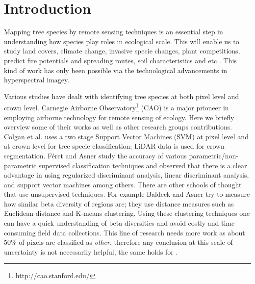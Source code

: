 \documentclass[remotesensing,article,accept,moreauthors,pdftex,12pt,a4paper]{mdpi}
\begin{document}
\section{Introduction}

Mapping tree species by remote sensing techniques is an essential step in understanding how species play roles in ecological scale. This will enable us to study land covers, climate change, invasive specie changes, plant competitions, predict fire potentials and spreading routes, soil characteristics and etc \cite{scholes1997tree, colgan2012mapping}. This kind of work has only been possible via the technological advancements in hyperspectral imagey. 

Various studies have dealt with identifying tree species at both pixel level and crown level. Carnegie Airborne Observatory\footnote{http://cao.stanford.edu/} (CAO)  is a major prioneer in employing airborne technology for remote sensing of ecology. Here we briefly overview some of their works as well as other research groups contributions. Colgan et al. \cite{colgan2012mapping} uses a two stage Support Vector Machines (SVM) at pixel level and at crown level for tree specie classification; LiDAR data is used for crown segmentation. F\'{e}ret and Asner \cite{feret2013tree} study the accuracy of various parametric/non-parametric supervised classification techniques and observed that there is a clear advantage in using regularized discriminant analysis, linear discriminant analysis, and support vector machines among others. There are other schools of thought that use unsupervised techniques. For example Baldeck and Asner \cite{baldeck2013estimating} try to measure how similar beta diversity of regions are; they use distance measures such as Euclidean distance and K-means clustering. Using these clustering techniques one can have a quick understanding of beta diversities and avoid costly and time consuming field data collections. This line of research needs more work as about 50\% of pixels are classified as \textit{other}, therefore any conclusion at this scale of uncertainty is not necessarily helpful, the same holds for \cite{baldeck2014landscape}.
\end{document}
